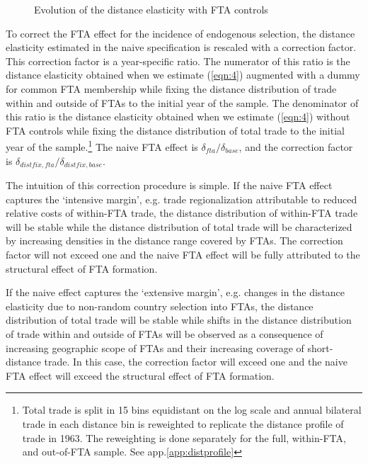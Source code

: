 \documentclass[12pt,twoside,a4paper,notitlepage]{article}
\begin{document}
\begin{figure}[h!]
\caption{Evolution of the distance elasticity with FTA controls \label{fig:ftabench}}
\begin{center}
\setlength{\fboxrule}{1pt} %
\setlength{\fboxsep}{.1in} %
\end{center}
\end{figure} 

To correct the FTA effect for the incidence of endogenous selection, the distance elasticity estimated in the naive  specification is rescaled with a correction factor.
This correction factor is a year-specific ratio.
The numerator of this ratio is the distance elasticity obtained when we estimate (\ref{eqn:4}) augmented with a dummy for common FTA membership while fixing the distance distribution of trade within and outside of FTAs to the initial year of the sample.
The denominator of this ratio is the distance elasticity obtained when we estimate (\ref{eqn:4}) without FTA controls while fixing the distance distribution of total trade to the initial year of the sample.\footnote{Total trade is split in 15 bins equidistant on the log scale and annual bilateral trade in each distance bin is reweighted to replicate the distance profile of trade in 1963.
The reweighting is done separately for the full, within-FTA, and out-of-FTA sample.
See app.\ref{app:distprofile}}
The naive FTA effect is $\delta_{fta}/\delta_{base}$, and the correction factor is $\delta_{distfix,fta}/\delta_{distfix,base}$.


The intuition of this correction procedure is simple.
If the naive FTA effect captures the `intensive margin', e.g.
trade regionalization attributable to reduced relative costs of within-FTA trade, the distance distribution of within-FTA trade will be stable while the distance distribution of total trade will be characterized by increasing densities in the distance range covered by FTAs.
The correction factor will not exceed one and the naive FTA effect will be fully attributed to the structural effect of FTA formation.

If the naive effect captures the `extensive margin', e.g.
changes in the distance elasticity due to non-random country selection into FTAs, the distance distribution of total trade will be stable while shifts in the distance distribution of trade within and outside of FTAs will be observed as a consequence of increasing geographic scope of FTAs and their increasing coverage of short-distance trade.
In this case, the correction factor will exceed one and the naive FTA effect will exceed the structural effect of FTA formation.
\end{document}
